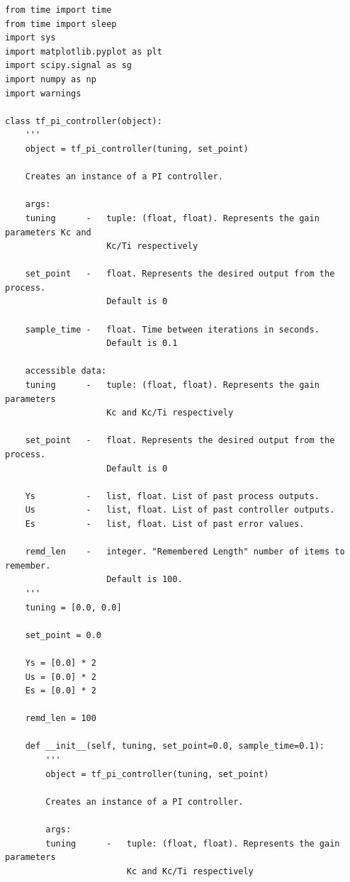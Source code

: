 \documentclass[twoside,a4]{report}
\begin{document}
\begin{Verbatim}[frame=single,fontsize=\footnotesize]
from time import time
from time import sleep
import sys
import matplotlib.pyplot as plt
import scipy.signal as sg
import numpy as np
import warnings

class tf_pi_controller(object):
	'''
	object = tf_pi_controller(tuning, set_point)
	
	Creates an instance of a PI controller.
	
	args:
	tuning      -   tuple: (float, float). Represents the gain parameters Kc and 
	                Kc/Ti respectively
	                
	set_point   -   float. Represents the desired output from the process. 
	                Default is 0
	                
	sample_time -   float. Time between iterations in seconds. 
	                Default is 0.1
	
	accessible data:
	tuning      -   tuple: (float, float). Represents the gain parameters 
	                Kc and Kc/Ti respectively
	                
	set_point   -   float. Represents the desired output from the process. 
	                Default is 0
	
	Ys          -   list, float. List of past process outputs.
	Us          -   list, float. List of past controller outputs.
	Es          -   list, float. List of past error values.
	
	remd_len    -   integer. "Remembered Length" number of items to remember. 
	                Default is 100.
	'''
	tuning = [0.0, 0.0]
	
	set_point = 0.0
	
	Ys = [0.0] * 2
	Us = [0.0] * 2
	Es = [0.0] * 2
	
	remd_len = 100
	
	def __init__(self, tuning, set_point=0.0, sample_time=0.1):
		'''
		object = tf_pi_controller(tuning, set_point)
		
		Creates an instance of a PI controller.
		
		args:
		tuning      -   tuple: (float, float). Represents the gain parameters 
		                Kc and Kc/Ti respectively
		                

\end{Verbatim}
\end{document}
